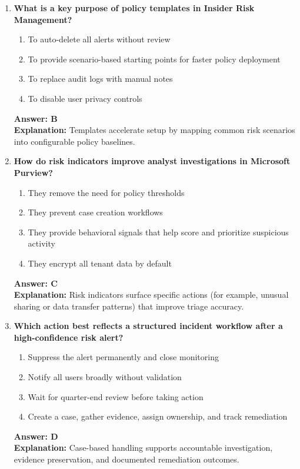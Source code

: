 \documentclass[10pt]{article}
\begin{document}
\begin{enumerate}[leftmargin=*]
\item \textbf{What is a key purpose of policy templates in Insider Risk Management?}
\begin{enumerate}[label=\Alph*.]
  \item To auto-delete all alerts without review
  \item To provide scenario-based starting points for faster policy deployment
  \item To replace audit logs with manual notes
  \item To disable user privacy controls
\end{enumerate}
\textbf{Answer: B}\\
\textbf{Explanation:} Templates accelerate setup by mapping common risk scenarios into configurable policy baselines.

\item \textbf{How do risk indicators improve analyst investigations in Microsoft Purview?}
\begin{enumerate}[label=\Alph*.]
  \item They remove the need for policy thresholds
  \item They prevent case creation workflows
  \item They provide behavioral signals that help score and prioritize suspicious activity
  \item They encrypt all tenant data by default
\end{enumerate}
\textbf{Answer: C}\\
\textbf{Explanation:} Risk indicators surface specific actions (for example, unusual sharing or data transfer patterns) that improve triage accuracy.

\item \textbf{Which action best reflects a structured incident workflow after a high-confidence risk alert?}
\begin{enumerate}[label=\Alph*.]
  \item Suppress the alert permanently and close monitoring
  \item Notify all users broadly without validation
  \item Wait for quarter-end review before taking action
  \item Create a case, gather evidence, assign ownership, and track remediation
\end{enumerate}
\textbf{Answer: D}\\
\textbf{Explanation:} Case-based handling supports accountable investigation, evidence preservation, and documented remediation outcomes.


\end{enumerate}
\end{document}
